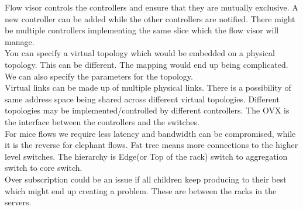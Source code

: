 \documentclass[solution,addpoints,12pt]{exam}
\begin{document}
Flow visor controls the controllers and ensure that they are mutually
exclusive. A new controller can be added while the other
controllers are notified. There might be multiple controllers
implementing the same slice which the flow visor will manage.\\
You can specify a virtual topology which would be embedded on a physical
topology. This can be different. The mapping would end up being
complicated. We can also specify the parameters for the topology.\\

Virtual links can be made up of multiple physical links.
There is a possibility of same address space being shared across
different virtual topologies. Different topologies may be
implemented/controlled by different controllers. The OVX
is the interface between the controllers and the switches.\\

For mice flows we require less latency and bandwidth can be
compromised, while it is the reverse for elephant flows.
Fat tree means more connections to the higher level switches.
The hierarchy is Edge(or Top of the rack) switch to aggregation switch to core
switch.\\

Over subscription could be an issue if all children keep producing to their
best which might end up creating a problem. These are between the
racks in the servers.
\end{document}
